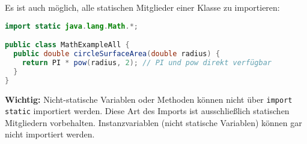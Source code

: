 Es ist auch möglich, alle statischen Mitglieder einer Klasse zu importieren:
\begin{lstlisting}[language=Java, caption={Statischer Import aller Mitglieder von Math}]
import static java.lang.Math.*;

public class MathExampleAll {
  public double circleSurfaceArea(double radius) {
    return PI * pow(radius, 2); // PI und pow direkt verfügbar
  }
}
\end{lstlisting}

\textbf{Wichtig:} Nicht-statische Variablen oder Methoden können nicht über \texttt{import static} importiert werden. 
Diese Art des Imports ist ausschließlich statischen Mitgliedern vorbehalten. Instanzvariablen (nicht statische Variablen) können
gar nicht importiert werden.
